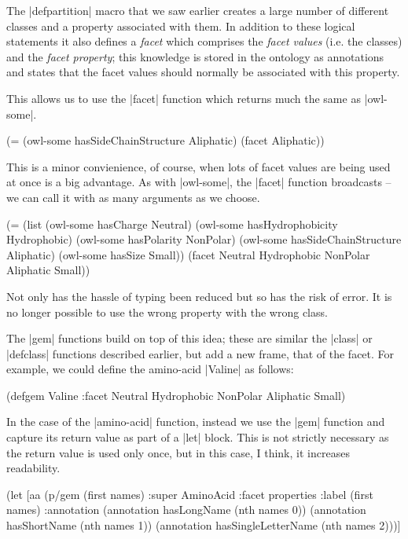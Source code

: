 The |defpartition| macro that we saw earlier creates a large number of
different classes and a property associated with them. In addition to
these logical statements it also defines a \emph{facet} which
comprises the \emph{facet values} (i.e. the classes) and the
\emph{facet property}; this knowledge is stored in the ontology as
annotations and states that the facet values should normally be
associated with this property.

This allows us to use the |facet| function which returns much the same
as |owl-some|.

\begin{tawnyexample}
(=
  (owl-some hasSideChainStructure Aliphatic)
  (facet Aliphatic))
\end{tawnyexample}

This is a minor convienience, of course, when lots of facet values are
being used at once is a big advantage. As with |owl-some|, the |facet|
function broadcasts -- we can call it with as many arguments as we
choose.

\begin{tawnyexample}
(=
  (list
    (owl-some hasCharge Neutral)
    (owl-some hasHydrophobicity Hydrophobic)
    (owl-some hasPolarity NonPolar)
    (owl-some hasSideChainStructure Aliphatic)
    (owl-some hasSize Small))
  (facet Neutral Hydrophobic NonPolar Aliphatic Small))
\end{tawnyexample}

Not only has the hassle of typing been reduced but so has the risk of
error. It is no longer possible to use the wrong property with the
wrong class.

The |gem| functions build on top of this idea; these are similar the
|class| or |defclass| functions described earlier, but add a new
frame, that of the facet. For example, we could define the amino-acid
|Valine| as follows:

\begin{tawnyexample}
(defgem Valine
  :facet Neutral Hydrophobic NonPolar Aliphatic Small)
\end{tawnyexample}

In the case of the |amino-acid| function, instead we use the |gem|
function and capture its return value as part of a |let| block. This
is not strictly necessary as the return value is used only once, but
in this case, I think, it increases readability.

\begin{tawny}
  (let [aa (p/gem (first names)
                :super AminoAcid
                :facet properties
                :label (first names)
                :annotation
                (annotation hasLongName (nth names 0))
                (annotation hasShortName (nth names 1))
                (annotation hasSingleLetterName (nth names 2)))]
\end{tawny}

